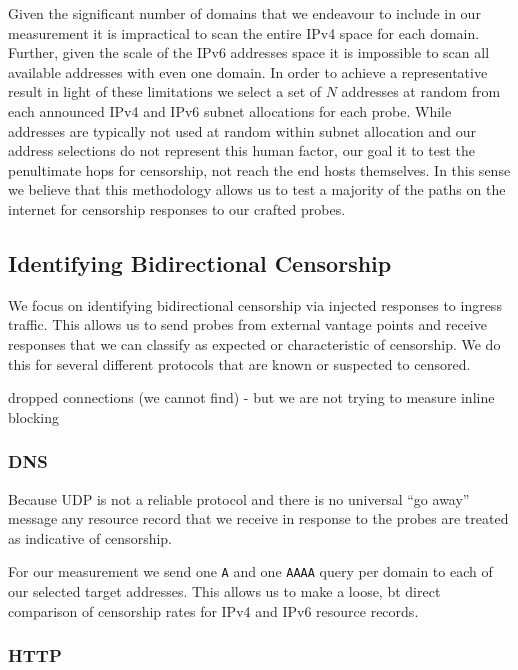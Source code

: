 Given the significant number of domains that we endeavour to include in our
measurement it is impractical to scan the entire IPv4 space for each domain.
Further, given the scale of the IPv6 addresses space it is impossible to scan
all available addresses with even one domain. In order to achieve a
representative result in light of these limitations we select a set of $N$
addresses at random from each announced IPv4 and IPv6 subnet allocations for
each probe. While addresses are typically not used at random within subnet
allocation and our address selections do not represent this human factor, our
goal it to test the penultimate hops for censorship, not reach the end hosts
themselves. In this sense we believe that this methodology allows us to test a
majority of the paths on the internet for censorship responses to our crafted
probes.

\subsection{Identifying Bidirectional Censorship}
\label{sec:methodology:censorship}

We focus on identifying bidirectional censorship via injected responses to
ingress traffic. This allows us to send probes from external vantage points and
receive responses that we can classify as expected or characteristic of
censorship. We do this for several different protocols that are known or
suspected to censored.


dropped connections (we cannot find) - but we are not trying to measure inline blocking

\FigProbeSend

\subsubsection{DNS}

Because UDP is not a reliable protocol and there is no universal ``go away''
message any resource record that we receive in response to the probes are
treated as indicative of censorship.

For our measurement we send one {\tt A} and one {\tt AAAA} query per domain to
each of our selected target addresses. This allows us to make a loose, bt direct
comparison of censorship rates for IPv4 and IPv6 resource records.

\subsubsection{HTTP}

